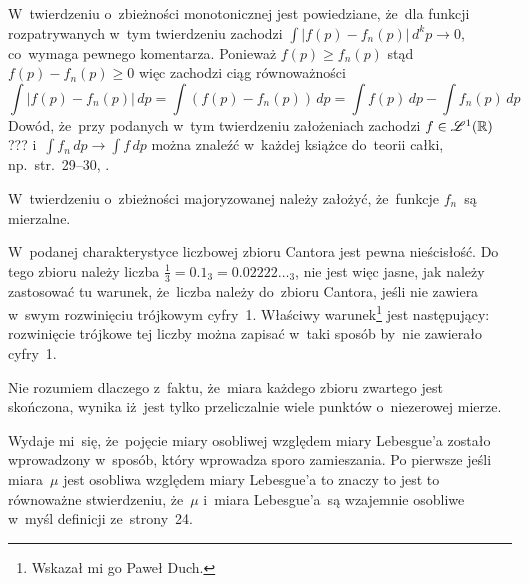 \documentclass[a4paper,11pt]{article}
\begin{document}
\start {} W~twierdzeniu o~zbieżności monotonicznej jest
powiedziane, że~dla funkcji rozpatrywanych w~tym twierdzeniu zachodzi
$\int | f( p ) - f_{ n }( p ) | \, d^{ k }p \to 0$, co~wymaga pewnego
komentarza. Ponieważ $f( p ) \geq f_{ n }( p )$ stąd
$f( p ) - f_{ n }( p ) \geq 0$ więc zachodzi ciąg równoważności
\begin{equation}
  \label{eq:RS-Vol-I-s01-14}
  \int | f( p ) - f_{ n }( p ) | \, dp
  = \int ( f( p ) - f_{ n }( p ) ) \, dp
  = \int f( p ) \, dp - \int f_{ n }( p ) \, dp
\end{equation}
Dowód, że~przy podanych w~tym twierdzeniu założeniach zachodzi
$f \in \mathcal{L}^{ 1 }( \mathbb{R} )$??? i~$\int f_{ n } \, dp \to \int f \, dp$ można
znaleźć w~każdej książce do~teorii całki, np.~str.~29--30,
\cite{RudinAnalizaRzeczywistaIZespolona1998}. %

\vspace{\spaceFour}



\start {} W~twierdzeniu o~zbieżności majoryzowanej należy
założyć, że~funkcje $f_{ n }$~są mierzalne. %

\vspace{\spaceFour}



\start {} W~podanej charakterystyce liczbowej zbioru Cantora
jest pewna nieścisłość. Do tego zbioru należy liczba
$\frac{ 1 }{ 3 } = 0.1_{ 3 } = 0.02222\ldots_{ 3 }$, nie jest więc jasne,
jak należy zastosować tu warunek, że~liczba należy do~zbioru Cantora,
jeśli nie zawiera w~swym rozwinięciu trójkowym cyfry~1. Właściwy
warunek\footnote{Wskazał mi go Paweł Duch.} jest następujący:
rozwinięcie trójkowe tej liczby można zapisać w~taki sposób by~nie
zawierało cyfry~1. %

\vspace{\spaceFour}



\start {} Nie rozumiem dlaczego z~faktu, że~miara każdego zbioru
zwartego jest skończona, wynika iż~jest tylko przeliczalnie wiele
punktów o~niezerowej mierze. \Dok

\vspace{\spaceFour}



\start {} Wydaje mi~się, że~pojęcie miary osobliwej względem
miary Lebesgue’a zostało wprowadzony w~sposób, który wprowadza sporo
zamieszania. Po pierwsze jeśli miara~$\mu$ jest osobliwa względem
miary Lebesgue’a to znaczy to jest to równoważne stwierdzeniu,
że~$\mu$ i~miara Lebesgue’a~są wzajemnie osobliwe w~myśl definicji
ze~strony~24.
\end{document}
